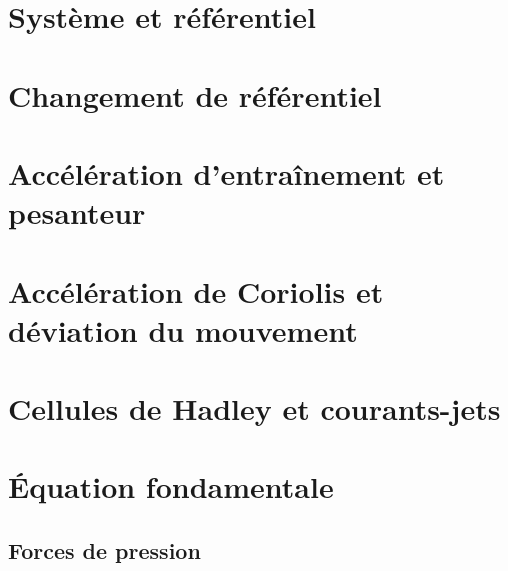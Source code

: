 \documentclass[a4paper,DIV16,10pt]{scrartcl}
\begin{document}
%
%


\newpage
\section{Système et référentiel}


\newpage
\section{Changement de référentiel}


\newpage
\section{Accélération d'entraînement et pesanteur}


\newpage
\section{Accélération de Coriolis et déviation du mouvement}


\newpage
\section{Cellules de Hadley et courants-jets}


\newpage
\section{\'Equation fondamentale}

\begin{detail}
\section{Forces de pression}

\end{detail}
\end{document}
